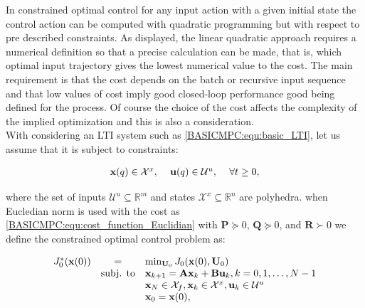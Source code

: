 	
	\label{BASICCSR:sec:OptimalControl}
	
	In constrained optimal control for any input action with a given initial state the control action can be computed with quadratic programming but with respect to pre described constraints. As displayed, the linear quadratic approach requires a numerical definition so that a precise calculation can be made, that is, which optimal input trajectory gives the lowest numerical value to the cost. The main requirement is that the cost depends on the batch or recursive input sequence and that low values of cost imply good closed-loop performance good being defined for the process. Of course the choice of the cost affects the complexity of the implied optimization and this is also a consideration.\\
With considering an LTI system such as \ref{BASICMPC:equ:basic_LTI}, let us assume that it is subject to constraints:

\begin{equation}
        \begin{array}{rcl}
            \textbf{x}(q)\in\mathcal{X}^x,&\textnormal{ }\textbf{u}(q)\in\mathcal{U}^u,&\textnormal{ }\forall t\geq0,\\
        \end{array}
        \label{BASICMPC:equ:basic_LTI_constrained}
    \end{equation}

    where the set of inputs $\mathcal{U}^u\subseteq\mathbb{R}^m$ and states $\mathcal{X}^x\subseteq\mathbb{R}^n$ are polyhedra. when Eucledian norm is used with the cost as \ref{BASICMPC:equ:cost_function_Euclidian} with $\textbf{P}\succeq0$, $\textbf{Q}\succeq0$, and $\textbf{R}\succ0$ we define the constrained optimal control problem as:

    \begin{equation}
        \begin{array}{rcl}
            J^*_0(\textbf{x}(0))&=&\min_{\textbf{U}_0}J_0(\textbf{x}(0),\textbf{U}_0)\\
            &\textnormal{subj. to}&\textbf{x}_{k+1}=\textbf{Ax}_{k}+\textbf{Bu}_{k},k=0,1,\dots,N-1\\
            &&\textbf{x}_N\in\mathcal{X}_f,\textbf{x}_k\in\mathcal{X}^x,\textbf{u}_k\in\mathcal{U}^u\\
            &&\textbf{x}_0=\textbf{x}(0),
        \end{array}
        \label{BASICMPC:equ:constrained_optimal_control_problem}
    \end{equation}

